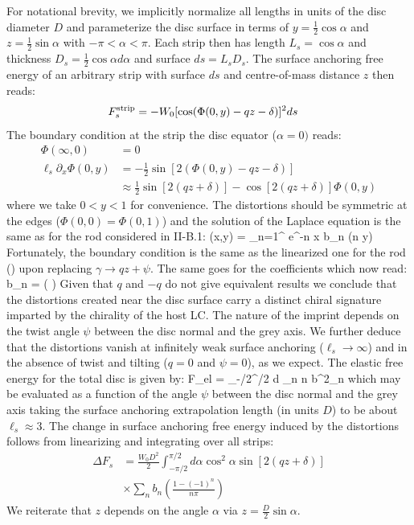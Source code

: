 For notational brevity, we implicitly normalize all lengths in units of the disc diameter $D$ and parameterize the disc surface in terms of $y = \tfrac{1}{2} \cos \alpha$ and $z = \tfrac{1}{2} \sin \alpha$ with $-\pi < \alpha <  \pi$. Each strip then has length $L_{s} = \cos \alpha$ and thickness $D_{s} = \tfrac{1}{2} \cos \alpha d \alpha$ and surface $ds = L_{s}D_{s} $. The surface anchoring free energy of an arbitrary strip with surface $ds$ and centre-of-mass distance $z$ then reads:
\begin{align}
F_{s}^{\rm strip}  &= -W_{0} [\cos (\Phi(0,y) - qz -\delta )]^{2} ds
\label{sadisc}
\end{align}
The boundary condition at the strip the disc equator ($\alpha=0)$ reads:
\begin{align}
\Phi(  \infty, 0 ) & =  0 \nonumber \\
\ell_{s} \partial_{x} \Phi(0, y ) & =   -\frac{1}{2 }   \sin [2 ( \Phi(0,y) - qz - \delta ) ] \nonumber \\
& \approx \frac{1}{2} \sin [2(qz + \delta)]  - \cos [2 (qz + \delta)] \Phi(0,y)
\label{bcdisc1}
\end{align}
where we take $0<y<1$ for convenience. The distortions should be symmetric at the edges ($\Phi (0,0)  = \Phi (0, 1)$)
and the solution of the Laplace equation is the same as for the rod considered in II-B.1:
\beq
\Phi(x,y) = \sum_{n=1}^{\infty} e^{-n \pi x }  b_{n} \sin(n \pi y)
\label{seriesxy}
\eeq
Fortunately, the boundary condition  is the same as the linearized one  for the rod () upon replacing $\gamma \rightarrow qz + \psi $. The same goes for the coefficients which now read:
\beq
b_{n}  =  \left ( \right )
\label{bnscenario1}
\eeq
Given that  $q$ and $-q$ do not give equivalent results we conclude that the distortions created near the disc surface carry a distinct chiral signature imparted by the chirality of the host LC. The nature of the imprint depends on the twist angle $\psi$ between the disc normal and the grey axis.
We further deduce that the distortions vanish at infinitely weak surface anchoring ($\ell_{s} \rightarrow \infty$) and in the absence of twist and tilting ($q=0$ and $\psi=0$), as we expect. The elastic free energy for the total disc is given by:
\beq
\Delta F_{el} =   \int_{-\pi/2}^{\pi/2} d \alpha \cos \alpha \sum_{n} n b^{2}_{n}
\eeq
which may be evaluated as a function of the angle $\psi$ between the disc normal and the grey axis taking the surface anchoring extrapolation length (in units $D$) to be about $\ell_{s} \approx 3$.
The change in surface anchoring free energy induced by the distortions follows from linearizing  and integrating over all strips:
\begin{align}
\Delta F_{s}  &= \frac{W_{0}D^{2}}{2} \int_{-\pi/2}^{\pi/2} d \alpha \cos^{2} \alpha \sin[2(qz + \delta)] \nonumber \\
&\times \sum_{n} b_{n}  \left ( \frac{1-(-1)^{n}}{n \pi}\right )
\label{sadiscseries}
\end{align}
We reiterate that $z$ depends on the angle $\alpha$ via $z = \tfrac{D}{2} \sin \alpha$.

